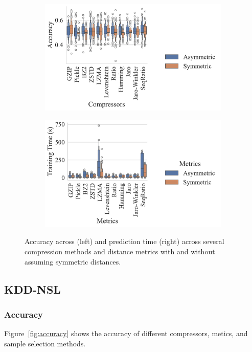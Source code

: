 \documentclass[sigconf]{acmart}
\begin{document}
\begin{figure}
    \begin{subfigure}
        \centering
        \includegraphics[width=.36\textwidth]{figs/truthseeker/symmetric_vs_metric.pdf}
    \end{subfigure}
    \begin{subfigure}
        \centering
        \includegraphics[width=.36\textwidth]{figs/truthseeker/symmetric_vs_metric_train_time.pdf}
    \end{subfigure}
    \caption{Accuracy across (left) and prediction time (right) across several compression methods and distance metrics with and without assuming symmetric distances.}
    \label{fig:symmetry}
\end{figure}


\subsection{KDD-NSL}

\subsubsection{Accuracy}
Figure~\ref{fig:accuracy} shows the accuracy of different compressors, metics, and sample selection methods.
\end{document}
